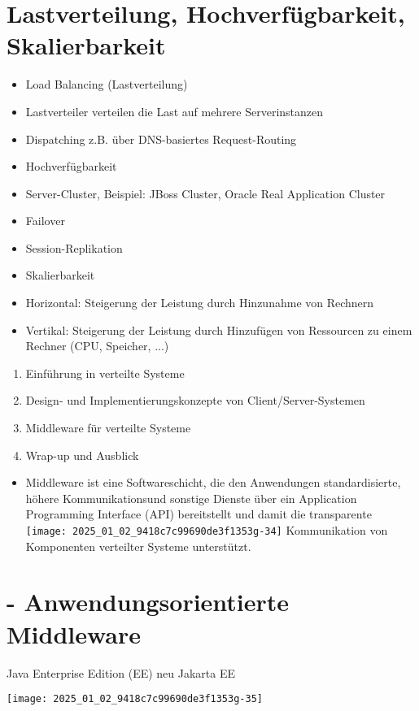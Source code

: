 \documentclass[10pt]{article}
\begin{document}
\section*{Lastverteilung, Hochverfügbarkeit, Skalierbarkeit}
\begin{itemize}
  \item Load Balancing (Lastverteilung)
  \item Lastverteiler verteilen die Last auf mehrere Serverinstanzen
  \item Dispatching z.B. über DNS-basiertes Request-Routing
  \item Hochverfügbarkeit
  \item Server-Cluster, Beispiel: JBoss Cluster, Oracle Real Application Cluster
  \item Failover
  \item Session-Replikation
  \item Skalierbarkeit
  \item Horizontal: Steigerung der Leistung durch Hinzunahme von Rechnern
  \item Vertikal: Steigerung der Leistung durch Hinzufügen von Ressourcen zu einem Rechner (CPU, Speicher, ...)
\end{itemize}

\begin{enumerate}
  \item Einführung in verteilte Systeme
  \item Design- und Implementierungskonzepte von Client/Server-Systemen
  \item Middleware für verteilte Systeme
  \item Wrap-up und Ausblick
\end{enumerate}

\begin{itemize}
  \item Middleware ist eine Softwareschicht, die den Anwendungen standardisierte, höhere Kommunikationsund sonstige Dienste über ein Application Programming Interface (API) bereitstellt und damit die transparente\\
\texttt{[image: 2025\_01\_02\_9418c7c99690de3f1353g-34]} Kommunikation von Komponenten verteilter Systeme unterstützt.
\end{itemize}

\section*{- Anwendungsorientierte Middleware}
 Java Enterprise Edition (EE) neu Jakarta EE\begin{center}
\texttt{[image: 2025\_01\_02\_9418c7c99690de3f1353g-35]}
\end{center}
\end{document}
